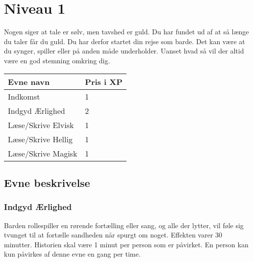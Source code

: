 \chapter{Niveau 1}
Nogen siger at tale er sølv, men tavshed er guld. Du har fundet ud af at så længe du taler får du guld. Du har derfor startet din rejse som barde. Det kan være at du synger, spiller eller på anden måde underholder. Uanset hvad så vil der altid være en god stemning omkring dig.
\begin{table}[H]
    \centering
    \begin{tabular}{|p{}|p{}|}
    \rowcolor{cerulean!80}\hline
        Evne navn & Pris i XP \\\hline
         Indkomst & 1 \\\hline
         Indgyd Ærlighed & 2 \\\hline
         Læse/Skrive Elvisk & 1 \\\hline
         Læse/Skrive Hellig & 1 \\\hline
         Læse/Skrive Magisk & 1 \\\hline
    \end{tabular}
\end{table} 

\section{Evne beskrivelse}

\subsection{Indgyd Ærlighed}
Barden rollespiller en rørende fortælling eller sang, og alle der lytter, vil føle sig tvunget til at fortælle sandheden når spurgt om noget. Effekten varer 30 minutter. Historien skal være 1 minut per person som er påvirket. En person kan kun påvirkes af denne evne en gang per time.








